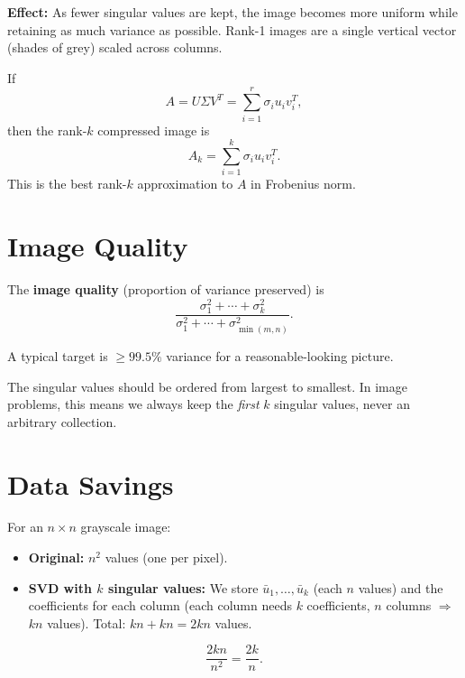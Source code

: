 \textbf{Effect:} As fewer singular values are kept, the image becomes more uniform while retaining as much variance as possible. Rank-1 images are a single vertical vector (shades of grey) scaled across columns.

If
\[
A=U\Sigma V^T=\sum_{i=1}^r \sigma_i u_i v_i^T,
\]
then the rank-$k$ compressed image is
\[
A_k=\sum_{i=1}^k \sigma_i u_i v_i^T.
\]
This is the best rank-$k$ approximation to $A$ in Frobenius norm.

\section{Image Quality}

\begin{definition}
The \textbf{image quality} (proportion of variance preserved) is
\[
\frac{\sigma_1^2+\cdots+\sigma_k^2}{\sigma_1^2+\cdots+\sigma_{\min(m,n)}^2}.
\]
\end{definition}

A typical target is $\geq 99.5\%$ variance for a reasonable-looking picture.

\begin{remark}
The singular values should be ordered from largest to smallest. In image problems, this means we always keep the \emph{first} $k$ singular values, never an arbitrary collection.
\end{remark}

\section{Data Savings}

For an $n\times n$ grayscale image:
\begin{itemize}
  \item \textbf{Original:} $n^2$ values (one per pixel).
  \item \textbf{SVD with $k$ singular values:} We store $\bar{u}_1,\ldots,\bar{u}_k$ (each $n$ values) and the coefficients for each column (each column needs $k$ coefficients, $n$ columns $\Rightarrow$ $kn$ values). Total: $kn + kn = 2kn$ values.
\end{itemize}

\begin{definition}
\[
\frac{2kn}{n^2} = \frac{2k}{n}.
\]
\end{definition}

